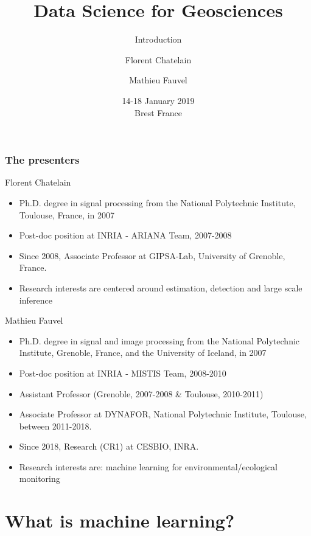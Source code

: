 \documentclass[pressentation,9pt,aspectratio=1610,xcolor=table]{beamer}
\title{Data Science for Geosciences}
\subtitle{Introduction}
\author{Florent Chatelain \inst{1} \and Mathieu Fauvel \inst{2}}
\institute{
  \inst{1} MCF Grenoble INP, GIPSA-lab \and %
  \inst{2} CR1 INRA, CESBIO
}
\date{14-18 January 2019\\Brest France}
\begin{document}
\maketitle
\pgfplotsset{compat=newest}


\begin{frame}
  \frametitle{The presenters}
  \begin{block}{Florent Chatelain}
    \begin{itemize}
    \item Ph.D. degree in signal processing from the National Polytechnic Institute, Toulouse, France, in 2007
    \item Post-doc position at INRIA - ARIANA Team, 2007-2008
    \item Since 2008, Associate Professor at GIPSA-Lab, University of Grenoble, France.
    \item Research interests are centered around estimation, detection and large scale inference
    \end{itemize}
  \end{block}

  \begin{block}{Mathieu Fauvel}
    \begin{itemize}
    \item Ph.D. degree in signal and image processing from the National Polytechnic Institute, Grenoble, France, and the University of Iceland, in 2007
    \item Post-doc position at INRIA - MISTIS Team, 2008-2010
    \item Assistant Professor (Grenoble, 2007-2008 \& Toulouse, 2010-2011)
    \item Associate Professor at DYNAFOR, National Polytechnic Institute, Toulouse, between 2011-2018.
    \item Since 2018, Research (CR1) at CESBIO, INRA.
    \item Research interests are: machine learning for environmental/ecological monitoring
    \end{itemize}
  \end{block}
\end{frame}

\section{What is machine learning?}
\end{document}
